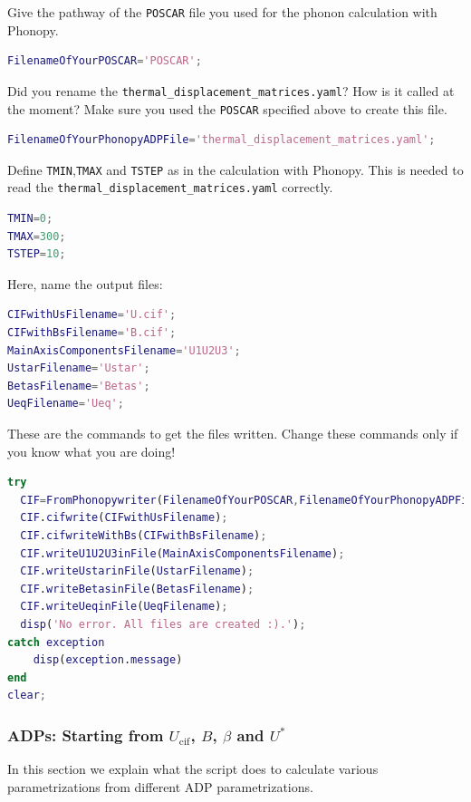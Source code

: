 \documentclass[12pt,a4paper]{article}
\begin{document}
Give the pathway of the \texttt{POSCAR} file you used for the phonon calculation with Phonopy.
\begin{lstlisting}[frame=single,language=Matlab] 
FilenameOfYourPOSCAR='POSCAR';
\end{lstlisting}


Did you rename the \texttt{thermal\_displacement\_matrices.yaml}? How is it called at the moment? Make sure you used the \texttt{POSCAR} specified above to create this file.
\begin{lstlisting}[frame=single,language=Matlab] 
FilenameOfYourPhonopyADPFile='thermal_displacement_matrices.yaml';
\end{lstlisting}
Define \texttt{TMIN},\texttt{TMAX} and \texttt{TSTEP} as in the calculation with Phonopy. This is needed to read the \texttt{thermal\_displacement\_matrices.yaml} correctly.
\begin{lstlisting}[frame=single,language=Matlab] 
TMIN=0;
TMAX=300;
TSTEP=10;
\end{lstlisting}
Here, name the output files:
\begin{lstlisting}[frame=single,language=Matlab] 
CIFwithUsFilename='U.cif';
CIFwithBsFilename='B.cif';
MainAxisComponentsFilename='U1U2U3';
UstarFilename='Ustar';
BetasFilename='Betas';
UeqFilename='Ueq';
\end{lstlisting}
These are the commands to get the files written. Change these commands only if you know what you are doing!
\begin{lstlisting}[frame=single,language=Matlab] 
try
  CIF=FromPhonopywriter(FilenameOfYourPOSCAR,FilenameOfYourPhonopyADPFile,TMIN,TMAX,TSTEP);
  CIF.cifwrite(CIFwithUsFilename);
  CIF.cifwriteWithBs(CIFwithBsFilename);
  CIF.writeU1U2U3inFile(MainAxisComponentsFilename);
  CIF.writeUstarinFile(UstarFilename);
  CIF.writeBetasinFile(BetasFilename);
  CIF.writeUeqinFile(UeqFilename);
  disp('No error. All files are created :).');
catch exception
    disp(exception.message)
end
clear;
\end{lstlisting}




\subsubsection{ADPs: Starting from  $U_{\mathrm{cif}}$, $B$, $\beta$ and $U^*$}

In this section we explain what the script does to calculate various parametrizations from different ADP parametrizations. 
\end{document}
